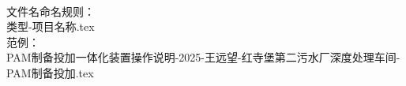 \documentclass[UTF8,a4paper,12pt,titlepage]{ctexart}
\begin{document}
\quad\\
文件名命名规则：\\
类型-项目名称.tex\\
范例：\\
PAM制备投加一体化装置操作说明-2025-王远望-红寺堡第二污水厂深度处理车间-PAM制备投加.tex\\
\end{document}
